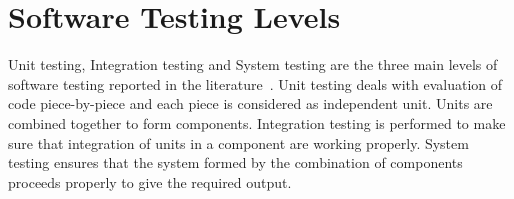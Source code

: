 %
%
%
%



\section{Software Testing Levels}
Unit testing, Integration testing and System testing are the three main levels of software testing reported in the literature~\cite{chilenski1994applicability}. Unit testing deals with evaluation of code piece-by-piece and each piece is considered as independent unit. Units are combined together to form components. Integration testing is performed to make sure that integration of units in a component are working properly. System testing ensures that the system formed by the combination of components proceeds properly to give the required output.

